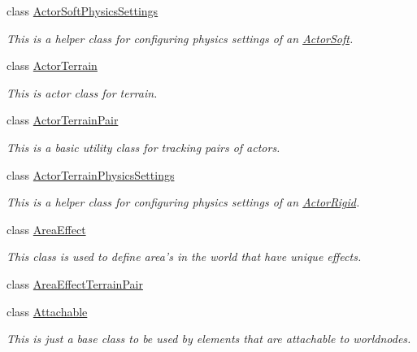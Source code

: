\begin{DoxyCompactItemize}
class \hyperlink{classMezzanine_1_1ActorSoftPhysicsSettings}{ActorSoftPhysicsSettings}
\begin{DoxyCompactList}\small\item\em This is a helper class for configuring physics settings of an \hyperlink{classMezzanine_1_1ActorSoft}{ActorSoft}. \item\end{DoxyCompactList}\item 
class \hyperlink{classMezzanine_1_1ActorTerrain}{ActorTerrain}
\begin{DoxyCompactList}\small\item\em This is actor class for terrain. \item\end{DoxyCompactList}\item 
class \hyperlink{classMezzanine_1_1ActorTerrainPair}{ActorTerrainPair}
\begin{DoxyCompactList}\small\item\em This is a basic utility class for tracking pairs of actors. \item\end{DoxyCompactList}\item 
class \hyperlink{classMezzanine_1_1ActorTerrainPhysicsSettings}{ActorTerrainPhysicsSettings}
\begin{DoxyCompactList}\small\item\em This is a helper class for configuring physics settings of an \hyperlink{classMezzanine_1_1ActorRigid}{ActorRigid}. \item\end{DoxyCompactList}\item 
class \hyperlink{classMezzanine_1_1AreaEffect}{AreaEffect}
\begin{DoxyCompactList}\small\item\em This class is used to define area's in the world that have unique effects. \item\end{DoxyCompactList}\item 
class \hyperlink{classMezzanine_1_1AreaEffectTerrainPair}{AreaEffectTerrainPair}
\item 
class \hyperlink{classMezzanine_1_1Attachable}{Attachable}
\begin{DoxyCompactList}\small\item\em This is just a base class to be used by elements that are attachable to worldnodes. \item\end{DoxyCompactList}\item 

\end{DoxyCompactItemize}
